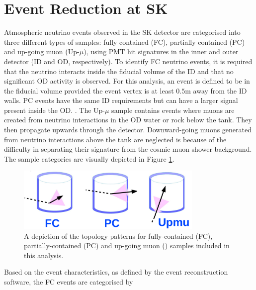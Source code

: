 \section{Event Reduction at SK}
\label{sec:Simulations_Reduction}

Atmospheric neutrino events observed in the SK detector are categorised into three different types of samples: fully contained (FC), partially contained (PC) and up-going muon (Up-$\mu$), using PMT hit signatures in the inner and outer detector (ID and OD, respectively). To identify FC neutrino events, it is required that the neutrino interacts inside the fiducial volume of the ID and that no significant OD activity is observed. For this analysis, an event is defined to be in the fiducial volume provided the event vertex is at least $0.5$m away from the ID walls. PC events have the same ID requirements but can have a larger signal present inside the OD.  . The Up-$\mu$ sample contains events where muons are created from neutrino interactions in the OD water or rock below the tank. They then propagate upwards through the detector. Downward-going muons generated from neutrino interactions above the tank are neglected is because of the difficulty in separating their signature from the cosmic muon shower background. The sample categories are visually depicted in Figure \ref{fig:Simulations_AtmosphericSampleTopology}.

\begin{figure}[ht!]
    \centering
    \includegraphics[width=0.8\textwidth]{Figures/Simulations/Atmo_topology.pdf}
    \caption{A depiction of the topology patterns for fully-contained (FC), partially-contained (PC) and up-going muon () samples included in this analysis.}
    \label{fig:Simulations_AtmosphericSampleTopology}
\end{figure}

Based on the event characteristics, as defined by the \fq event reconstruction software, the FC events are categorised by

